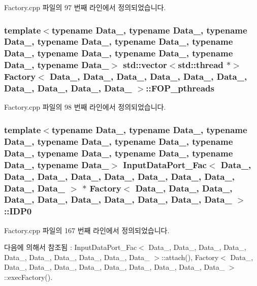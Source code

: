 Factory.\+cpp 파일의 97 번째 라인에서 정의되었습니다.

\subsubsection[{\texorpdfstring{F\+O\+P\+\_\+pthreads}{FOP_pthreads}}]{\setlength{\rightskip}{0pt plus 5cm}template$<$typename Data\+\_, typename Data\+\_, typename Data\+\_, typename Data\+\_, typename Data\+\_, typename Data\+\_, typename Data\+\_, typename Data\+\_, typename Data\+\_, typename Data\+\_$>$ std\+::vector$<$std\+::thread $\ast$$>$ {\bf Factory}$<$ Data\+\_, Data\+\_, Data\+\_, Data\+\_, Data\+\_, Data\+\_, Data\+\_, Data\+\_, Data\+\_, Data\+\_ $>$\+::F\+O\+P\+\_\+pthreads\hspace{0.3cm}{\ttfamily [private]}}\hypertarget{classFactory_adef777708bab91c0dc6a20eba43c3e1e}{}\label{classFactory_adef777708bab91c0dc6a20eba43c3e1e}


Factory.\+cpp 파일의 98 번째 라인에서 정의되었습니다.

\subsubsection[{\texorpdfstring{I\+D\+P0}{IDP0}}]{\setlength{\rightskip}{0pt plus 5cm}template$<$typename Data\+\_, typename Data\+\_, typename Data\+\_, typename Data\+\_, typename Data\+\_, typename Data\+\_, typename Data\+\_, typename Data\+\_, typename Data\+\_, typename Data\+\_$>$ {\bf Input\+Data\+Port\+\_\+\+Fac}$<$ Data\+\_, Data\+\_, Data\+\_, Data\+\_, Data\+\_, Data\+\_, Data\+\_, Data\+\_, Data\+\_, Data\+\_ $>$ $\ast$ {\bf Factory}$<$ Data\+\_, Data\+\_, Data\+\_, Data\+\_, Data\+\_, Data\+\_, Data\+\_, Data\+\_, Data\+\_, Data\+\_ $>$\+::I\+D\+P0}\hypertarget{classFactory_ae0d8f03ec007e2da61fbc59840193256}{}\label{classFactory_ae0d8f03ec007e2da61fbc59840193256}


Factory.\+cpp 파일의 167 번째 라인에서 정의되었습니다.



다음에 의해서 참조됨 \+:  Input\+Data\+Port\+\_\+\+Fac$<$ Data\+\_, Data\+\_, Data\+\_, Data\+\_, Data\+\_, Data\+\_, Data\+\_, Data\+\_, Data\+\_, Data\+\_ $>$\+::attach(), Factory$<$ Data\+\_, Data\+\_, Data\+\_, Data\+\_, Data\+\_, Data\+\_, Data\+\_, Data\+\_, Data\+\_, Data\+\_ $>$\+::exec\+Factory().

